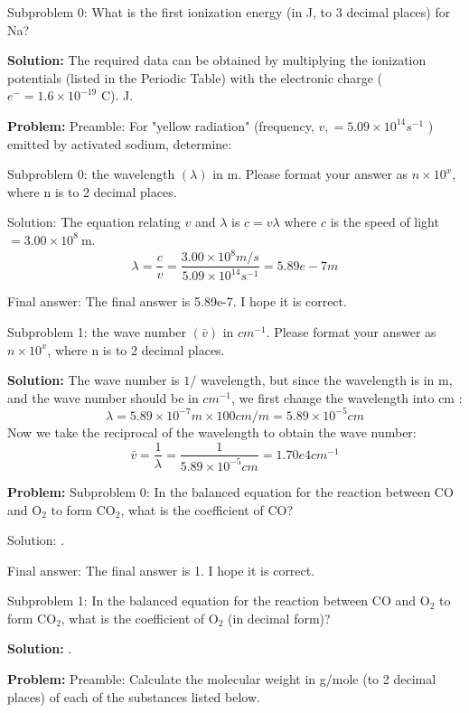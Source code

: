 \documentclass[10pt]{article}
\begin{document}
Subproblem 0: What is the first ionization energy (in J, to 3 decimal places) for Na?


\textbf{Solution:}
The required data can be obtained by multiplying the ionization potentials (listed in the Periodic Table) with the electronic charge ( ${e}^{-}=1.6 \times 10^{-19}$ C).
 J.


\textbf{Problem:}
Preamble: For "yellow radiation" (frequency, $v,=5.09 \times 10^{14} s^{-1}$ ) emitted by activated sodium, determine:

Subproblem 0: the wavelength $(\lambda)$ in m. Please format your answer as $n \times 10^x$, where n is to 2 decimal places.


Solution: The equation relating $v$ and $\lambda$ is $c=v \lambda$ where $c$ is the speed of light $=3.00 \times 10^{8} \mathrm{~m}$.
\[
\lambda=\frac{c}{v}=\frac{3.00 \times 10^{8} m / s}{5.09 \times 10^{14} s^{-1}}=\boxed{5.89e-7} m
\]

Final answer: The final answer is 5.89e-7. I hope it is correct.

Subproblem 1: the wave number $(\bar{v})$ in ${cm}^{-1}$. Please format your answer as $n \times 10^x$, where n is to 2 decimal places.


\textbf{Solution:}
The wave number is $1 /$ wavelength, but since the wavelength is in m, and the wave number should be in ${cm}^{-1}$, we first change the wavelength into cm :
\[
\lambda=5.89 \times 10^{-7} m \times 100 cm / m=5.89 \times 10^{-5} cm
\]
Now we take the reciprocal of the wavelength to obtain the wave number:
\[
\bar{v}=\frac{1}{\lambda}=\frac{1}{5.89 \times 10^{-5} cm}= \boxed{1.70e4} {cm}^{-1}
\]


\textbf{Problem:}
Subproblem 0: In the balanced equation for the reaction between $\mathrm{CO}$ and $\mathrm{O}_{2}$ to form $\mathrm{CO}_{2}$, what is the coefficient of $\mathrm{CO}$?


Solution: .

Final answer: The final answer is 1. I hope it is correct.

Subproblem 1: In the balanced equation for the reaction between $\mathrm{CO}$ and $\mathrm{O}_{2}$ to form $\mathrm{CO}_{2}$, what is the coefficient of $\mathrm{O}_{2}$ (in decimal form)?


\textbf{Solution:}
. 


\textbf{Problem:}
Preamble: Calculate the molecular weight in g/mole (to 2 decimal places) of each of the substances listed below.
\end{document}
